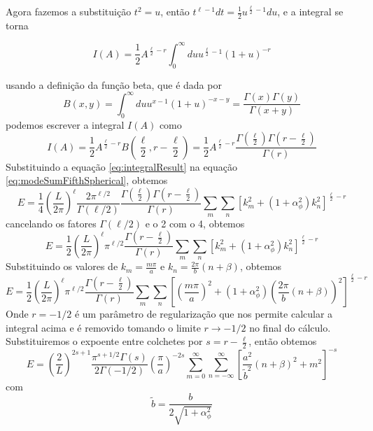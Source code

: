 Agora fazemos a substituição $t^2 = u$, então $t^{\ell-1} dt = \frac{1}{2} u^{\frac{\ell}{2}-1} du$, e a integral se torna

\begin{equation}
    I(A) = \frac{1}{2} A^{\frac{\ell}{2}-r} \int_0^\infty du u^{\frac{\ell}{2}-1} (1 + u)^{-r}
\end{equation}

usando a definição da função beta, que é dada por
\begin{equation}
    B(x,y) = \int_0^\infty du u^{x-1} (1 + u)^{-x-y} = \frac{\Gamma(x)\Gamma(y)}{\Gamma(x+y)} \label{eq:betaFuncDef}
\end{equation}
podemos escrever a integral $I(A)$ como
\begin{equation}
    I(A) = \frac{1}{2} A^{\frac{\ell}{2}-r} B\left( \frac{\ell}{2}, r - \frac{\ell}{2} \right) = \frac{1}{2} A^{\frac{\ell}{2}-r} \frac{\Gamma(\frac{\ell}{2})\Gamma(r-\frac{\ell}{2})}{\Gamma(r)} \label{eq:integralResult}
\end{equation}
Substituindo a equação \eqref{eq:integralResult} na equação \eqref{eq:modeSumFifthSpherical}, obtemos
\begin{equation}
    E = \frac{1}{4} \left( \frac{L}{2 \pi} \right)^\ell \frac{2\pi^{\ell/2}}{\Gamma(\ell/2)} \frac{\Gamma(\frac{\ell}{2})\Gamma(r-\frac{\ell}{2})}{\Gamma(r)} \sum_m \sum_n [k_m^2 + (1+\alpha_\phi^2)k_n^2]^{\frac{\ell}{2}-r} \label{eq:modeSumFifthSphericalResult}
\end{equation}
cancelando os fatores $\Gamma(\ell/2)$ e o 2 com o 4, obtemos
\begin{equation}
    E = \frac{1}{2} \left( \frac{L}{2 \pi} \right)^\ell \pi^{\ell/2} \frac{\Gamma(r-\frac{\ell}{2})}{\Gamma(r)} \sum_m \sum_n [k_m^2 + (1+\alpha_\phi^2)k_n^2]^{\frac{\ell}{2}-r} \label{eq:modeSumFifthSphericalResult2}
\end{equation}
Substituindo os valores de $k_m=\frac{m\pi}{a}$ e $k_n=\frac{2\pi}{b}(n+\beta)$, obtemos
\begin{equation}
    E = \frac{1}{2} \left( \frac{L}{2 \pi} \right)^\ell \pi^{\ell/2} \frac{\Gamma(r-\frac{\ell}{2})}{\Gamma(r)} \sum_m \sum_n \left[ \left( \frac{m\pi}{a} \right)^2 + (1+\alpha_\phi^2) \left( \frac{2\pi}{b}(n+\beta) \right)^2 \right]^{\frac{\ell}{2}-r} \label{eq:modeSumFifthSphericalResult3}
\end{equation}
Onde $r=-1/2$ é um parâmetro de regularização que nos permite calcular a integral acima e é removido tomando o limite $r \to -1/2$ no final do cálculo. Substituiremos o expoente entre colchetes por $s=r-\frac{\ell}{2}$, então obtemos
\begin{equation}
    E = \left( \frac{2}{L} \right)^{2s+1} \frac{\pi^{s + 1/2}\Gamma(s)}{2\Gamma(-1/2)}  \left(\frac{\pi}{a} \right)^{-2s} \sum_{m=0}^\infty \sum_{n=-\infty}^{\infty} \left[ \frac{a^2}{\tilde{b}^2} (n + \beta)^2 + m^2 \right]^{-s} \label{eq:modeSumFifthSphericalResult4}
\end{equation}
com
\begin{equation}
    \tilde{b} = \frac{b}{2\sqrt{1+\alpha_\phi^2}} \label{eq:tildeb}
\end{equation}


